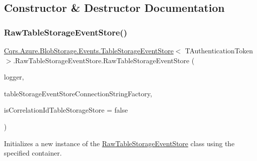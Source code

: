 \subsection{Constructor \& Destructor Documentation}
\mbox{\label{classCqrs_1_1Azure_1_1BlobStorage_1_1Events_1_1TableStorageEventStore_1_1RawTableStorageEventStore_aa6aa02462732467a16148e0d094cd308}} 
\subsubsection{\texorpdfstring{Raw\+Table\+Storage\+Event\+Store()}{RawTableStorageEventStore()}}
{\footnotesize\ttfamily \hyperlink{classCqrs_1_1Azure_1_1BlobStorage_1_1Events_1_1TableStorageEventStore}{Cqrs.\+Azure.\+Blob\+Storage.\+Events.\+Table\+Storage\+Event\+Store}$<$ T\+Authentication\+Token $>$.Raw\+Table\+Storage\+Event\+Store.\+Raw\+Table\+Storage\+Event\+Store (\begin{DoxyParamCaption}\item[{I\+Logger}]{logger,  }\item[{\hyperlink{interfaceCqrs_1_1Azure_1_1BlobStorage_1_1ITableStorageStoreConnectionStringFactory}{I\+Table\+Storage\+Store\+Connection\+String\+Factory}}]{table\+Storage\+Event\+Store\+Connection\+String\+Factory,  }\item[{bool}]{is\+Correlation\+Id\+Table\+Storage\+Store = {\ttfamily false} }\end{DoxyParamCaption})}



Initializes a new instance of the \hyperlink{classCqrs_1_1Azure_1_1BlobStorage_1_1Events_1_1TableStorageEventStore_1_1RawTableStorageEventStore}{Raw\+Table\+Storage\+Event\+Store} class using the specified container. 



